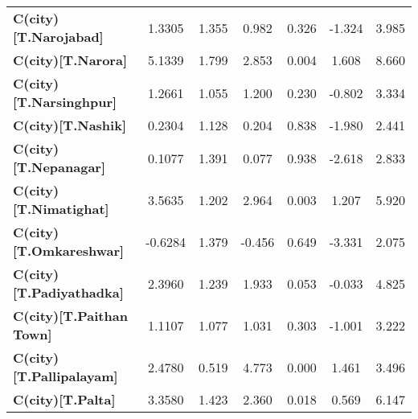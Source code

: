 \begin{center}
\begin{tabular}{lcccccc}
\textbf{C(city)[T.Narojabad]}                                                                       &       1.3305  &        1.355     &     0.982  &         0.326        &       -1.324    &        3.985     \\
\textbf{C(city)[T.Narora]}                                                                          &       5.1339  &        1.799     &     2.853  &         0.004        &        1.608    &        8.660     \\
\textbf{C(city)[T.Narsinghpur]}                                                                     &       1.2661  &        1.055     &     1.200  &         0.230        &       -0.802    &        3.334     \\
\textbf{C(city)[T.Nashik]}                                                                          &       0.2304  &        1.128     &     0.204  &         0.838        &       -1.980    &        2.441     \\
\textbf{C(city)[T.Nepanagar]}                                                                       &       0.1077  &        1.391     &     0.077  &         0.938        &       -2.618    &        2.833     \\
\textbf{C(city)[T.Nimatighat]}                                                                      &       3.5635  &        1.202     &     2.964  &         0.003        &        1.207    &        5.920     \\
\textbf{C(city)[T.Omkareshwar]}                                                                     &      -0.6284  &        1.379     &    -0.456  &         0.649        &       -3.331    &        2.075     \\
\textbf{C(city)[T.Padiyathadka]}                                                                    &       2.3960  &        1.239     &     1.933  &         0.053        &       -0.033    &        4.825     \\
\textbf{C(city)[T.Paithan Town]}                                                                    &       1.1107  &        1.077     &     1.031  &         0.303        &       -1.001    &        3.222     \\
\textbf{C(city)[T.Pallipalayam]}                                                                    &       2.4780  &        0.519     &     4.773  &         0.000        &        1.461    &        3.496     \\
\textbf{C(city)[T.Palta]}                                                                           &       3.3580  &        1.423     &     2.360  &         0.018        &        0.569    &        6.147     \\

\end{tabular}
\end{center}
